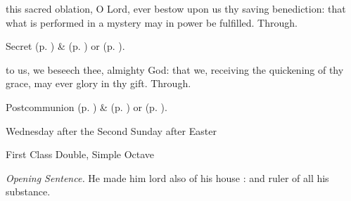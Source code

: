 \secret\label{EasterIISecret}
 this sacred oblation, O Lord, ever bestow upon us thy saving benediction: that what is performed in a mystery may in power be fulfilled. Through.
\begin{rubric}
     Secret  (p. \pageref{SPMaryInEaster}) \&   (p. \pageref{SPAgainst}) or  (p. \pageref{SPChiefBishop}).
\end{rubric}
\postcommunion\label{EasterIIPostcommunion}
 to us, we beseech thee, almighty God: that we, receiving the quickening of thy grace, may ever glory in thy gift. Through.


\begin{rubric}
     Postcommunion  (p. \pageref{SPMaryInEaster}) \&   (p. \pageref{SPAgainst}) or  (p. \pageref{SPChiefBishop}).
\end{rubric}


%

\clearpage
{}
\begin{inhead}
    {Wednesday after the Second Sunday after Easter}\par
    {First Class Double, Simple Octave}
\end{inhead}
\par\noindent
\textit{Opening Sentence.} He made him lord also of his house : and ruler of all his substance.


